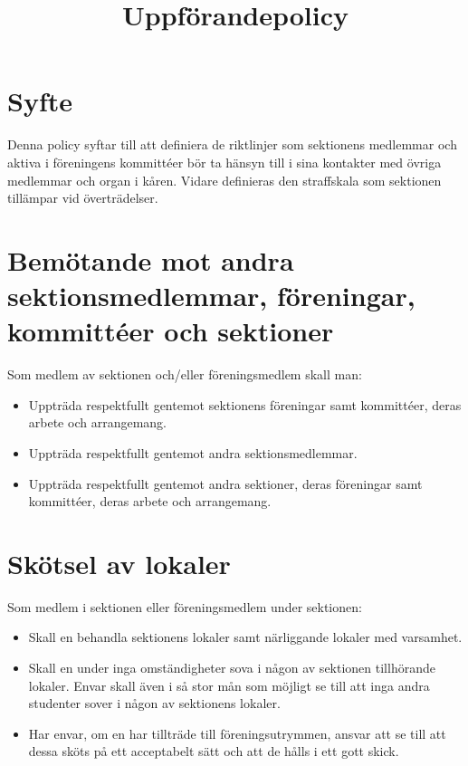 \documentclass[11pt, includeaddress]{classes/cthit}
\begin{document}
\title{Uppförandepolicy}
\maketitle

\thispagestyle{empty}

\newpage

\makeheadfoot%

\setcounter{tocdepth}{2}
\setcounter{page}{1}
\tableofcontents

\newpage

\section{Syfte}
Denna policy syftar till att definiera de riktlinjer som sektionens medlemmar och aktiva i föreningens kommittéer bör ta hänsyn till i sina kontakter med övriga medlemmar och organ i kåren. Vidare definieras den straffskala som sektionen tillämpar vid överträdelser. 

\section{Bemötande mot andra sektionsmedlemmar, föreningar, kommittéer och sektioner}
Som medlem av sektionen och/eller föreningsmedlem skall man:

\begin{itemize}
	\item Uppträda respektfullt gentemot sektionens föreningar samt kommittéer, deras arbete och arrangemang.
	\item Uppträda respektfullt gentemot andra sektionsmedlemmar.
 	\item Uppträda respektfullt gentemot andra sektioner, deras föreningar samt kommittéer, deras arbete och arrangemang.

\end{itemize}

\section{Skötsel av lokaler}
Som medlem i sektionen eller föreningsmedlem under sektionen:

\begin{itemize}
	\item Skall en behandla sektionens lokaler samt närliggande lokaler med varsamhet.
	\item Skall en under inga omständigheter sova i någon av sektionen tillhörande lokaler. Envar skall även i så stor mån som möjligt se till att inga andra studenter sover i någon av sektionens lokaler.
 	\item Har envar, om en har tillträde till föreningsutrymmen, ansvar att se till att dessa sköts på ett acceptabelt sätt och att de hålls i ett gott skick.
	
\end{itemize}
\end{document}
